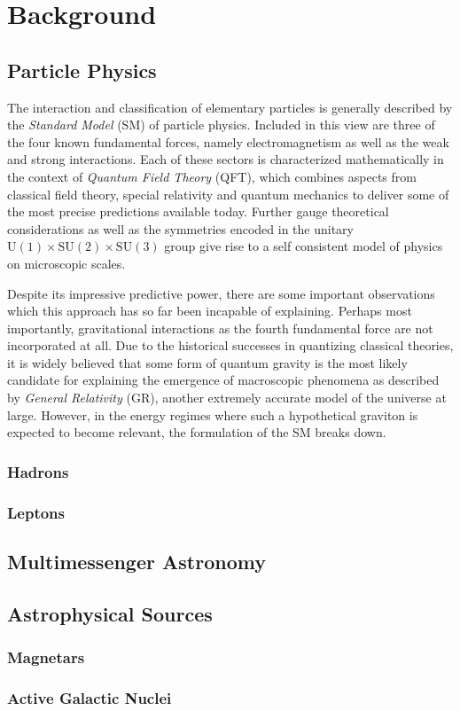 \chapter{Background}
\label{ch:background}

\section{Particle Physics}
\label{sec:particle}

The interaction and classification of elementary particles is generally described by the \emph{Standard Model} (SM) of particle physics.
Included in this view are three of the four known fundamental forces, namely electromagnetism as well as the weak and strong interactions.
Each of these
sectors is characterized mathematically in the context of \emph{Quantum Field Theory} (QFT), which combines aspects from classical field theory,
special relativity and quantum mechanics to deliver some of the most precise predictions available today. Further gauge theoretical considerations
as well as the symmetries encoded in the unitary $\text{U}(1) \times \text{SU}(2) \times \text{SU}(3)$ group give rise to a self consistent model
of physics on microscopic scales.

Despite its impressive predictive power, there are some important observations which this approach has so far been incapable of explaining.
Perhaps most importantly, gravitational interactions as the fourth fundamental force are not incorporated at all. Due to the historical successes
in quantizing classical theories, it is widely believed that some form of quantum gravity is the most likely candidate for explaining the emergence
of macroscopic phenomena as described by \emph{General Relativity} (GR), another extremely accurate model of the universe at large.
However, in the energy regimes where such a hypothetical graviton is expected to become relevant, the formulation of the SM breaks down.

\subsection*{Hadrons}
\label{sub:hadrons}

\subsection*{Leptons}
\label{sub:leptons}

\section{Multimessenger Astronomy}
\label{sec:multimessenger}

\section{Astrophysical Sources}
\label{sec:sources}

\subsection*{Magnetars}
\label{sub:magnetars}

\subsection*{Active Galactic Nuclei}
\label{sub:agn}

